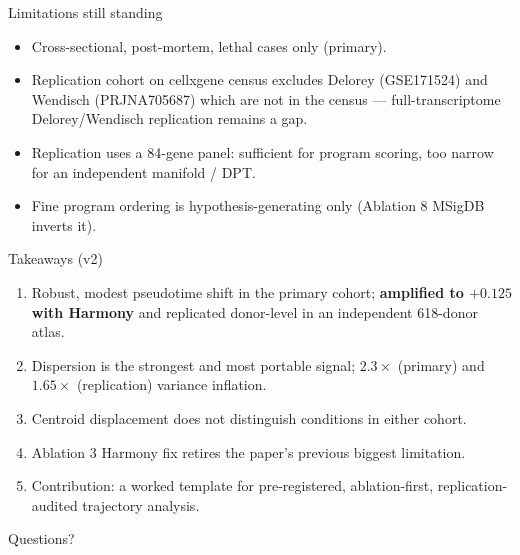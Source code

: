 \documentclass[aspectratio=169]{beamer}
\begin{document}
\begin{frame}{Limitations still standing}
\begin{itemize}
  \item Cross-sectional, post-mortem, lethal cases only (primary).
  \item Replication cohort on cellxgene census excludes Delorey (GSE171524) and
        Wendisch (PRJNA705687) which are not in the census --- full-transcriptome
        Delorey/Wendisch replication remains a gap.
  \item Replication uses a 84-gene panel: sufficient for program scoring, too narrow
        for an independent manifold / DPT.
  \item Fine program ordering is hypothesis-generating only (Ablation 8 MSigDB inverts it).
\end{itemize}
\end{frame}

\begin{frame}{Takeaways (v2)}
\begin{enumerate}
  \item Robust, modest pseudotime shift in the primary cohort; \textbf{amplified to $+0.125$
        with Harmony} and replicated donor-level in an independent 618-donor atlas.
  \item Dispersion is the strongest and most portable signal; $2.3\times$ (primary)
        and $1.65\times$ (replication) variance inflation.
  \item Centroid displacement does not distinguish conditions in either cohort.
  \item Ablation 3 Harmony fix retires the paper's previous biggest limitation.
  \item Contribution: a worked template for pre-registered, ablation-first,
        replication-audited trajectory analysis.
\end{enumerate}
\end{frame}

\begin{frame}[standout]
Questions?
\end{frame}
\end{document}
